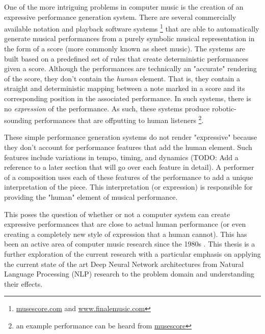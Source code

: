 One of the more intriguing problems in computer music is the creation of an expressive performance generation system. There are several commercially available notation and playback software systems \footnote{\url{musescore.com} and \url{www.finalemusic.com}} that are able to automatically generate musical performances from a purely symbolic musical representation in the form of a score (more commonly known as sheet music). The systems are built based on a predefined set of rules that create deterministic performances given a score. Although the performances are technically an "accurate" rendering of the score, they don't contain the \emph{human} element. That is, they contain a straight and deterministic mapping between a note marked in a score and its corresponding position in the associated performance. In such systems, there is no \emph{expression} of the performance. As such, these systems produce robotic-sounding performances that are offputting to human listeners \footnote{an example performance can be heard from \href{https://musescore.com/user/33884420/scores/6466906}{musescore}}. 

These simple performance generation systems do not render "expressive" because they don't account for performance features that add the human element. Such features include variations in tempo, timing, and dynamics (TODO: Add a reference to a later section that will go over each feature in detail). A performer of a composition uses each of these features of the performance to add a unique interpretation of the piece. This interpretation (or expression) is responsible for providing the "human" element of musical performance. 

This poses the question of whether or not a computer system can create expressive performances that are close to actual human performance (or even creating a completely new style of expression that a human cannot). This has been an active area of computer music research since the 1980s \cite{friberg2006overview}. This thesis is a further exploration of the current research with a particular emphasis on applying the current state of the art Deep Neural Network architectures from Natural Language Processing (NLP) research to the problem domain and understanding their effects. 

